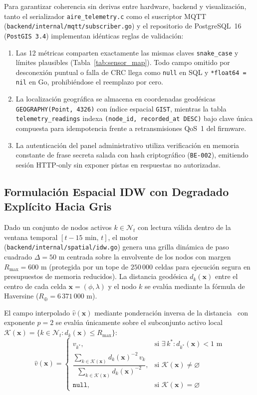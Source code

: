 \documentclass[conference]{IEEEtran}
\begin{document}
Para garantizar coherencia sin derivas entre hardware, backend y visualización, tanto el serializador \texttt{aire\_telemetry.c} como el suscriptor MQTT (\texttt{backend/internal/mqtt/subscriber.go}) y el repositorio de PostgreSQL~16 (\texttt{PostGIS 3.4}) implementan idénticas reglas de validación:
\begin{enumerate}
    \item Las 12 métricas comparten exactamente las mismas claves \texttt{snake\_case} y límites plausibles (Tabla~\ref{tab:sensor_map}). Todo campo omitido por desconexión puntual o falla de CRC llega como \texttt{null} en SQL y \texttt{*float64 = nil} en Go, prohibiéndose el reemplazo por cero.
    \item La localización geográfica se almacena en coordenadas geodésicas \texttt{GEOGRAPHY(Point, 4326)} con índice espacial \texttt{GIST}, mientras la tabla \texttt{telemetry\_readings} indexa \texttt{(node\_id, recorded\_at DESC)} bajo clave única compuesta para idempotencia frente a retransmisiones QoS~1 del firmware.
    \item La autenticación del panel administrativo utiliza verificación en memoria constante de frase secreta salada con hash criptográfico (\texttt{BE-002}), emitiendo sesión HTTP-only sin exponer pistas en respuestas no autorizadas.
\end{enumerate}

\subsection{Formulación Espacial IDW con Degradado Explícito Hacia Gris}

Dado un conjunto de nodos activos $k \in \mathcal{N}_t$ con lectura válida dentro de la ventana temporal $[t - 15\text{ min},\, t]$, el motor (\texttt{backend/internal/spatial/idw.go}) genera una grilla dinámica de paso cuadrado $\Delta = 50\text{ m}$ centrada sobre la envolvente de los nodos con margen $R_{\max} = 600\text{ m}$ (protegida por un tope de $250\,000$ celdas para ejecución segura en presupuestos de memoria reducidos). La distancia geodésica $d_k(\mathbf{x})$ entre el centro de cada celda $\mathbf{x}=(\phi,\lambda)$ y el nodo $k$ se evalúa mediante la fórmula de Haversine ($R_{\oplus}=6\,371\,000\text{ m}$).

El campo interpolado $\hat{v}(\mathbf{x})$ mediante ponderación inversa de la distancia~\cite{shepard1968idw} con exponente $p=2$ se evalúa únicamente sobre el subconjunto activo local $\mathcal{K}(\mathbf{x}) = \{k \in \mathcal{N}_t : d_k(\mathbf{x}) \le R_{\max}\}$:
\begin{equation}
\hat{v}(\mathbf{x}) =
\begin{cases}
v_{k^*}, & \text{si } \exists\, k^* : d_{k^*}(\mathbf{x}) < 1\text{ m} \\
\dfrac{\sum_{k \in \mathcal{K}(\mathbf{x})} d_k(\mathbf{x})^{-2}\, v_k}{\sum_{k \in \mathcal{K}(\mathbf{x})} d_k(\mathbf{x})^{-2}}, & \text{si } \mathcal{K}(\mathbf{x}) \neq \varnothing \\
\texttt{null}, & \text{si } \mathcal{K}(\mathbf{x}) = \varnothing
\end{cases}
\label{eq:idw}
\end{equation}
\end{document}
